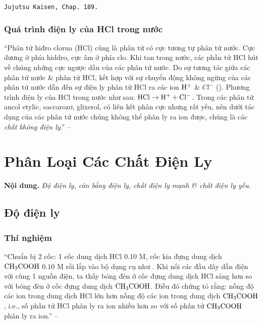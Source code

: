 \documentclass[oneside]{book}
\numberwithin{equation}{section}
\begin{document}
\texttt{Jujutsu Kaisen, Chap. 189.}

\subsubsection{Quá trình điện ly của HCl trong nước}
``Phân tử hiđro clorua (HCl) cũng là phân tử có cực tương tự phân tử nước. Cực dương ở phía hiddro, cực âm ở phía clo. Khi tan trong nước, các phần tử HCl hút về chúng những cực ngược dấu của các phân tử nước. Do sự tương tác giữa các phân tử nước \& phân tử HCl, kết hợp với sự chuyển động không ngừng của các phân tử nước dẫn đến sự điện ly phân tử HCl ra các ion $\rm H^+$ \& $Cl^-$ (\cite[Hình 1.4: \textsf{Sơ đồ quá  trình phân ly ra ion của phân tử HCl trong nước (Thực tế trong dung dịch $\rm H^+$ luôn tồn tại dưới dạng $\rm H_3O^+$)}, p. 6]{SGK_Hoa_Hoc_11_nang_cao}). Phương trình điện ly của HCl trong nước như sau: $\rm HCl\to H^+ + Cl^-$. Trong các phân tử ancol etylic, saccarozơ, glixerol, có liên kết phân cực nhưng rất yếu, nên dưới tác dụng của các phân tử nước chúng không thể phân ly ra ion được, chúng là các \textit{chất không điện ly}.'' -- \cite[pp. 6--7]{SGK_Hoa_Hoc_11_nang_cao}


\section{Phân Loại Các Chất Điện Ly}
\textbf{Nội dung.} \textit{Độ điện ly, cân bằng điện ly, chất điện ly mạnh \& chất điện ly yếu}.

\subsection{Độ điện ly}

\subsubsection{Thí nghiệm}
``Chuẩn bị 2 cốc: 1 cốc dung dịch HCl $0.10$ M, cốc kia đựng dung dịch $\rm CH_3COOH$ $0.10$ M rồi lắp vào bộ dụng cụ như \cite[ Hình 1.1, p. 4]{SGK_Hoa_Hoc_11_nang_cao}. Khi nối các đầu dây dẫn điện với cùng 1 nguồn điện, ta thấy bóng đèn ở cốc đựng dung dịch HCl sáng hơn so với bóng đèn ở cốc đựng dung dịch $\rm CH_3COOH$. Điều đó chứng tỏ rằng: nồng độ các ion trong dung dịch HCl lớn hơn nồng độ các ion trong dung dịch $\rm CH_3COOH$, i.e., số phần tử HCl phân ly ra ion nhiều hơn so với số phân tử $\rm CH_3COOH$ phân ly ra ion.'' -- \cite[p. 8]{SGK_Hoa_Hoc_11_nang_cao}
\end{document}

